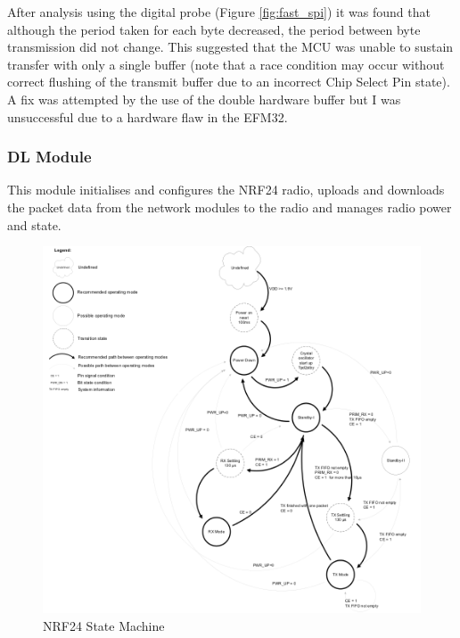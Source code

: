 After analysis using the digital probe (Figure \ref{fig:fast_spi}) it was found that although the period taken for each
byte decreased, the period between byte transmission did not change. This suggested that the \ac{MCU}
was unable to sustain transfer with only a single buffer (note that a race condition may occur
without correct flushing of the transmit buffer due to an incorrect Chip Select Pin state). A fix was
attempted by the use of the double hardware buffer but I was unsuccessful due to a hardware flaw
in the EFM32.


\subsubsection{\acf{DL} Module}
This module initialises and configures the \ac{NRF24} radio, uploads and downloads the packet data from
the network modules to the radio and manages radio power and state.

\begin{figure}
  \begin{center}
    \includegraphics[width=1\textwidth, keepaspectratio=true]{images/nrf24_state.png}
  \end{center}
  \caption[\ac{NRF24} State Machine]{\ac{NRF24} State Machine \cite{NRF24Spec}}
  \label{fig:nrf24spec}
\end{figure}

